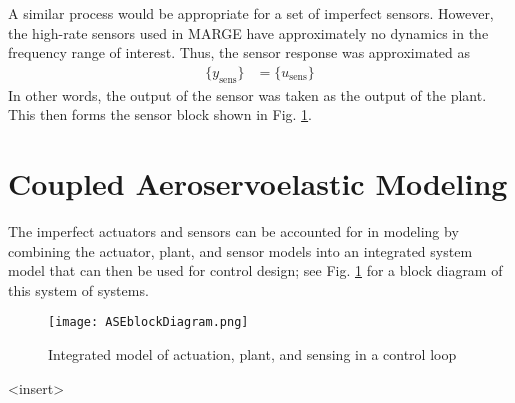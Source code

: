 A similar process would be appropriate for a set of imperfect sensors. However, the high-rate sensors used in MARGE have approximately no dynamics in the frequency range of interest. Thus, the sensor response was approximated as
\begin{align}
    \{y_\text{sens}\} &= \{u_\text{sens}\}
\end{align}
In other words, the output of the sensor was taken as the output of the plant. This then forms the sensor block shown in Fig. \ref{fig:actPlantSens}.

\section{Coupled Aeroservoelastic Modeling}

The imperfect actuators and sensors can be accounted for in modeling by combining the actuator, plant, and sensor models into an integrated system model that can then be used for control design; see Fig. \ref{fig:actPlantSens} for a block diagram of this system of systems.
\begin{figure}[h]
    \centering
    \texttt{[image: ASEblockDiagram.png]}
    \label{fig:actPlantSens}
    \caption{Integrated model of actuation, plant, and sensing in a control loop}
\end{figure}

<insert>